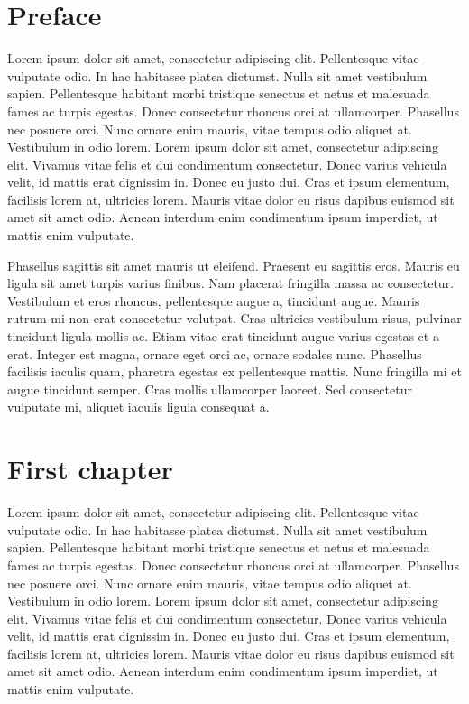 \documentclass{book}
\begin{document}
\frontmatter


\chapter{Preface}
Lorem ipsum dolor sit amet, consectetur adipiscing elit. Pellentesque vitae vulputate odio. In hac habitasse platea dictumst. Nulla sit amet vestibulum sapien. Pellentesque habitant morbi tristique senectus et netus et malesuada fames ac turpis egestas. Donec consectetur rhoncus orci at ullamcorper. Phasellus nec posuere orci. Nunc ornare enim mauris, vitae tempus odio aliquet at. Vestibulum in odio lorem. Lorem ipsum dolor sit amet, consectetur adipiscing elit. Vivamus vitae felis et dui condimentum consectetur. Donec varius vehicula velit, id mattis erat dignissim in. Donec eu justo dui. Cras et ipsum elementum, facilisis lorem at, ultricies lorem. Mauris vitae dolor eu risus dapibus euismod sit amet sit amet odio. Aenean interdum enim condimentum ipsum imperdiet, ut mattis enim vulputate.

Phasellus sagittis sit amet mauris ut eleifend. Praesent eu sagittis eros. Mauris eu ligula sit amet turpis varius finibus. Nam placerat fringilla massa ac consectetur. Vestibulum et eros rhoncus, pellentesque augue a, tincidunt augue. Mauris rutrum mi non erat consectetur volutpat. Cras ultricies vestibulum risus, pulvinar tincidunt ligula mollis ac. Etiam vitae erat tincidunt augue varius egestas et a erat. Integer est magna, ornare eget orci ac, ornare sodales nunc. Phasellus facilisis iaculis quam, pharetra egestas ex pellentesque mattis. Nunc fringilla mi et augue tincidunt semper. Cras mollis ullamcorper laoreet. Sed consectetur vulputate mi, aliquet iaculis ligula consequat a.

\mainmatter
\chapter{First chapter}
Lorem ipsum dolor sit amet, consectetur adipiscing elit. Pellentesque vitae vulputate odio. In hac habitasse platea dictumst. Nulla sit amet vestibulum sapien. Pellentesque habitant morbi tristique senectus et netus et malesuada fames ac turpis egestas. Donec consectetur rhoncus orci at ullamcorper. Phasellus nec posuere orci. Nunc ornare enim mauris, vitae tempus odio aliquet at. Vestibulum in odio lorem. Lorem ipsum dolor sit amet, consectetur adipiscing elit. Vivamus vitae felis et dui condimentum consectetur. Donec varius vehicula velit, id mattis erat dignissim in. Donec eu justo dui. Cras et ipsum elementum, facilisis lorem at, ultricies lorem. Mauris vitae dolor eu risus dapibus euismod sit amet sit amet odio. Aenean interdum enim condimentum ipsum imperdiet, ut mattis enim vulputate.
\end{document}
